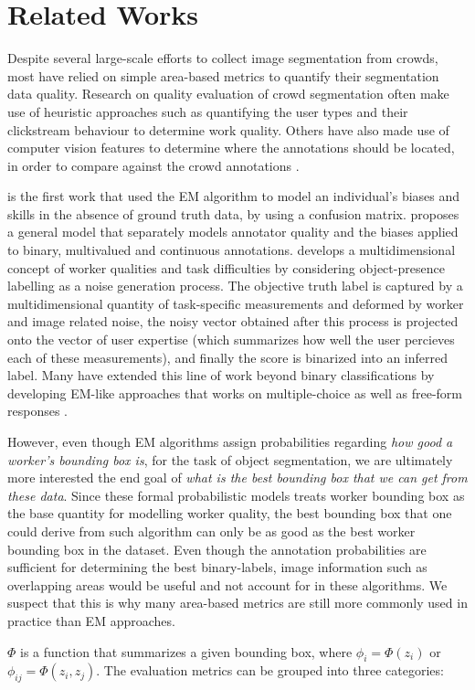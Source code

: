 \documentclass[letterpaper]{article} %
\begin{document}
\section{Related Works}
\par Despite several large-scale efforts to collect image segmentation from crowds\cite{Lin2014,MartinFTM01,Torralba2010,pascal-voc-2012}, most have relied on simple area-based metrics to quantify their segmentation data quality. Research on quality evaluation of crowd segmentation often make use of heuristic approaches such as quantifying the user types and their clickstream behaviour to determine work quality\cite{Cabezas2015,Sameki2015}. Others have also made use of computer vision features to determine where the annotations should be located, in order to compare against the crowd annotations \cite{Vittayakorn2011,Russakovsky2015}.
\par \cite{Dawid1979} is the first work that used the EM algorithm to model an individual's biases and skills in the absence of ground truth data, by using a confusion matrix. \cite{OCWelinder2010} proposes a general model that separately models annotator quality and the biases applied to binary, multivalued and continuous annotations. \cite{MDWWelinder2010} develops a multidimensional concept of worker qualities and task difficulties by considering object-presence labelling as a noise generation process. The objective truth label is captured by a multidimensional quantity of task-specific measurements and deformed by worker and image related noise, the noisy vector obtained after this process is projected onto the vector of user expertise (which summarizes how well the user percieves each of these measurements), and finally the score is binarized into an inferred label. Many have extended this line of work beyond binary classifications by developing EM-like approaches that works on multiple-choice \cite{Karger2013} as well as free-form responses \cite{Lin2012}. 
\par However, even though EM algorithms assign probabilities regarding  \textit{how good a worker's bounding box is}, for the task of object segmentation, we are ultimately more interested the end goal of \textit{what is the best bounding box that we can get from these data}. Since these formal probabilistic models treats worker bounding box as the base quantity for modelling worker quality, the best bounding box that one could derive from such algorithm can only be as good as the best worker bounding box in the dataset.  Even though the annotation probabilities are sufficient for determining the best binary-labels, image information such as overlapping areas would be useful and not account for in these algorithms. We suspect that this is why many area-based metrics are still more commonly used in practice than EM approaches.
\par $\Phi$ is a function that summarizes a given bounding box, where $\phi_i=\Phi(z_i)$ or $\phi_{ij}=\Phi(z_i,z_j)$.   The evaluation metrics can be grouped into three categories: 
\end{document}
